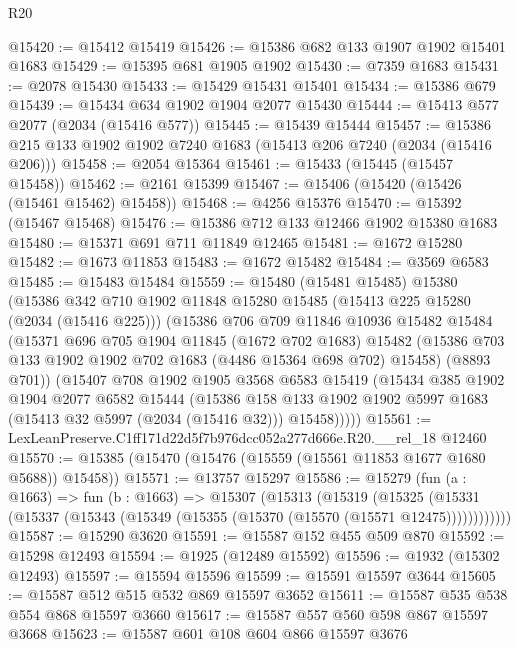 \begin{lexlean}{R20}
\begin{coremodule}
@15420 := @15412 @15419
@15426 := @15386 @682 @133 @1907 @1902 @15401 @1683
@15429 := @15395 @681 @1905 @1902
@15430 := @7359 @1683
@15431 := @2078 @15430
@15433 := @15429 @15431 @15401
@15434 := @15386 @679
@15439 := @15434 @634 @1902 @1904 @2077 @15430
@15444 := @15413 @577 @2077 (@2034 (@15416 @577))
@15445 := @15439 @15444
@15457 := @15386 @215 @133 @1902 @1902 @7240 @1683 (@15413 @206 @7240 (@2034 (@15416 @206)))
@15458 := @2054 @15364
@15461 := @15433 (@15445 (@15457 @15458))
@15462 := @2161 @15399
@15467 := @15406 (@15420 (@15426 (@15461 @15462) @15458))
@15468 := @4256 @15376
@15470 := @15392 (@15467 @15468)
@15476 := @15386 @712 @133 @12466 @1902 @15380 @1683
@15480 := @15371 @691 @711 @11849 @12465
@15481 := @1672 @15280
@15482 := @1673 @11853
@15483 := @1672 @15482
@15484 := @3569 @6583
@15485 := @15483 @15484
@15559 := @15480
    (@15481 @15485)
    @15380
    (@15386
      @342
      @710
      @1902
      @11848
      @15280
      @15485
      (@15413 @225 @15280 (@2034 (@15416 @225)))
      (@15386
        @706
        @709
        @11846
        @10936
        @15482
        @15484
        (@15371
          @696
          @705
          @1904
          @11845
          (@1672 @702 @1683)
          @15482
          (@15386 @703 @133 @1902 @1902 @702 @1683 (@4486 @15364 @698 @702) @15458)
          (@8893 @701))
        (@15407
          @708
          @1902
          @1905
          @3568
          @6583
          @15419
          (@15434
            @385
            @1902
            @1904
            @2077
            @6582
            @15444
            (@15386
              @158
              @133
              @1902
              @1902
              @5997
              @1683
              (@15413 @32 @5997 (@2034 (@15416 @32)))
              @15458)))))
@15561 := LexLeanPreserve.C1ff171d22d5f7b976dcc052a277d666e.R20.__rel_18 @12460
@15570 := @15385 (@15470 (@15476 (@15559 (@15561 @11853 @1677 @1680 @5688)) @15458))
@15571 := @13757 @15297
@15586 := @15279
    (fun (a : @1663) =>
    fun (b : @1663) =>
    @15307
      (@15313
        (@15319
          (@15325 (@15331 (@15337 (@15343 (@15349 (@15355 (@15370 (@15570 (@15571 @12475))))))))))))
@15587 := @15290 @3620
@15591 := @15587 @152 @455 @509 @870
@15592 := @15298 @12493
@15594 := @1925 (@12489 @15592)
@15596 := @1932 (@15302 @12493)
@15597 := @15594 @15596
@15599 := @15591 @15597 @3644
@15605 := @15587 @512 @515 @532 @869 @15597 @3652
@15611 := @15587 @535 @538 @554 @868 @15597 @3660
@15617 := @15587 @557 @560 @598 @867 @15597 @3668
@15623 := @15587 @601 @108 @604 @866 @15597 @3676

\end{coremodule}
\end{lexlean}
